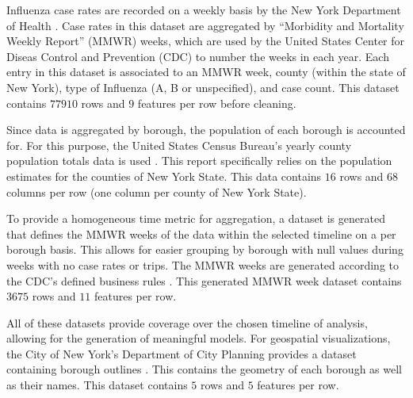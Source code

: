 \documentclass[11pt]{article}
\begin{document}
Influenza case rates are recorded on a weekly basis by the New York Department of Health \cite{fludataset}. 
Case rates in this dataset are aggregated by ``Morbidity and Mortality Weekly Report'' (MMWR) weeks, which are used by the United States Center for Diseas Control and Prevention (CDC) to number the weeks in each year\cite{mmwr}.
Each entry in this dataset is associated to an MMWR week, county (within the state of New York), type of Influenza (A, B or unspecified), and case count.
This dataset contains $77910$ rows and $9$ features per row before cleaning.

Since data is aggregated by borough, the population of each borough is accounted for.
For this purpose, the United States Census Bureau's yearly county population totals data is used \cite{populations2019, populations2020}.
This report specifically relies on the population estimates for the counties of New York State.
This data contains $16$ rows and $68$ columns per row (one column per county of New York State).

To provide a homogeneous time metric for aggregation, 
a dataset is generated that defines the MMWR weeks of the data within the selected timeline on a per borough basis.
This allows for easier grouping by borough with null values during weeks with no case rates or trips.
The MMWR weeks are generated according to the CDC's defined business rules \cite{mmwr}.
This generated MMWR week dataset contains $3675$ rows and $11$ features per row.

All of these datasets provide coverage over the chosen timeline of analysis, 
allowing for the generation of meaningful models.
For geospatial visualizations, 
the City of New York's Department of City Planning provides a dataset containing borough outlines \cite{boroughdataset}.
This contains the geometry of each borough as well as their names.
This dataset contains $5$ rows and $5$ features per row.




\end{document}
